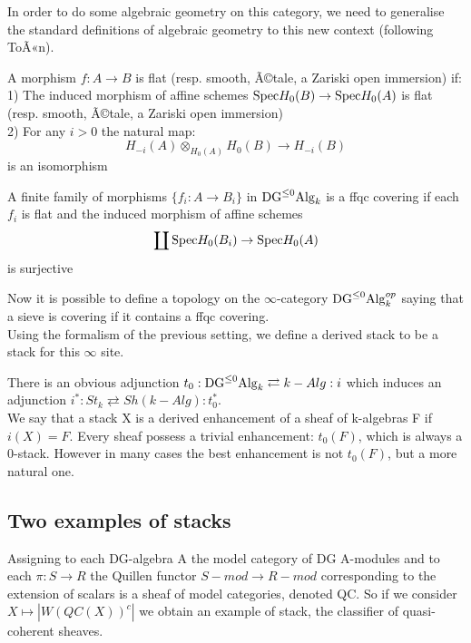 \begin{refsection}
In order to do some algebraic geometry on this category, we need to generalise the standard definitions of algebraic geometry to this new context (following ToÃ«n).\\
\begin{defin}
A morphism $f:A\to B$ is flat (resp. smooth, Ã©tale, a Zariski open immersion) if:\\
1) The induced morphism of affine schemes $\mathrm{Spec} H_0(B)\to \mathrm{Spec} H_0(A)$ is flat (resp. smooth, Ã©tale, a Zariski open immersion)\\
2) For any $i>0$ the natural map:
$$H_{-i}(A)\otimes_{H_0(A)}H_0(B)\to H_{-i}(B) $$
is an isomorphism
\end{defin}


\begin{defin}
A finite family of morphisms $\{ f_i:A\to B_i\}$ in $\mathrm{DG}^{\le 0}\mathrm{Alg}_k$ is a ffqc covering if each $f_i$ is flat and the induced morphism of affine schemes
$$\coprod \mathrm{Spec} H_0(B_i)\to \mathrm{Spec} H_0(A)$$
is surjective
\end{defin}

Now it is possible to define a topology on the $\infty$-category $\mathrm{DG}^{\le 0}\mathrm{Alg}_k^{op}$ saying that a sieve is covering if it contains a ffqc covering.\\
Using the formalism of the previous setting, we define a derived stack to be a stack for this $\infty$ site.\\


\begin{rmk}
There is an obvious adjunction $t_0:\mathrm{DG}^{\le 0}\mathrm{Alg}_k\rightleftarrows k-Alg:i$ which induces an adjunction $i^*:St_k\rightleftarrows Sh(k-Alg):t_0^*$.\\
We say that a stack X is a derived enhancement of a sheaf of k-algebras F if $i(X)=F$. Every sheaf possess a trivial enhancement: $t_0(F)$, which
is always a 0-stack.
However in many cases the best enhancement is not $t_0(F)$, but a more natural one.
\end{rmk}


\subsection{Two examples of stacks}

\begin{defin}
Assigning to each DG-algebra A the model category of DG A-modules and to each $\pi: S\to R$ the Quillen functor $S-mod\to R-mod$ corresponding to the extension of scalars
is a sheaf of model categories, denoted QC. So if we consider $X\mapsto |W(QC(X))^c|$ we obtain an example of stack, the classifier of quasi-coherent sheaves. 
\end{defin}


\end{refsection}
